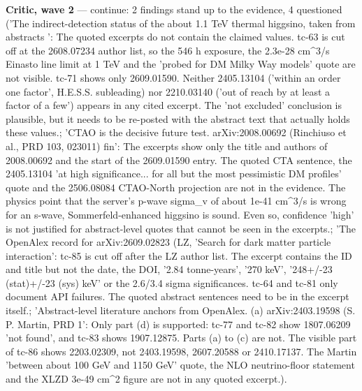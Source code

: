 \documentclass[11pt,a4paper]{article}
\begin{document}
\textbf{Critic, wave 2} --- continue: 2 findings stand up to the evidence, 4 questioned ('The indirect-detection status of the about 1.1 TeV thermal higgsino, taken from abstracts ': The quoted excerpts do not contain the claimed values. tc-63 is cut off at the 2608.07234 author list, so the 546 h exposure, the 2.3e-28 cm\textasciicircum{}3/s Einasto line limit at 1 TeV and the 'probed for DM Milky Way models' quote are not visible. tc-71 shows only 2609.01590. Neither 2405.13104 ('within an order one factor', H.E.S.S. subleading) nor 2210.03140 ('out of reach by at least a factor of a few') appears in any cited excerpt. The 'not excluded' conclusion is plausible, but it needs to be re-posted with the abstract text that actually holds these values.; 'CTAO is the decisive future test. arXiv:2008.00692 (Rinchiuso et al., PRD 103, 023011) fin': The excerpts show only the title and authors of 2008.00692 and the start of the 2609.01590 entry. The quoted CTA sentence, the 2405.13104 'at high significance... for all but the most pessimistic DM profiles' quote and the 2506.08084 CTAO-North projection are not in the evidence. The physics point that the server's p-wave sigma\_v of about 1e-41 cm\textasciicircum{}3/s is wrong for an s-wave, Sommerfeld-enhanced higgsino is sound. Even so, confidence 'high' is not justified for abstract-level quotes that cannot be seen in the excerpts.; 'The OpenAlex record for arXiv:2609.02823 (LZ, 'Search for dark matter particle interaction': tc-85 is cut off after the LZ author list. The excerpt contains the ID and title but not the date, the DOI, '2.84 tonne-years', '270 keV', '248+/-23 (stat)+/-23 (sys) keV' or the 2.6/3.4 sigma significances. tc-64 and tc-81 only document API failures. The quoted abstract sentences need to be in the excerpt itself.; 'Abstract-level literature anchors from OpenAlex. (a) arXiv:2403.19598 (S. P. Martin, PRD 1': Only part (d) is supported: tc-77 and tc-82 show 1807.06209 'not found', and tc-83 shows 1907.12875. Parts (a) to (c) are not. The visible part of tc-86 shows 2203.02309, not 2403.19598, 2607.20588 or 2410.17137. The Martin 'between about 100 GeV and 1150 GeV' quote, the NLO neutrino-floor statement and the XLZD 3e-49 cm\textasciicircum{}2 figure are not in any quoted excerpt.).
\end{document}
